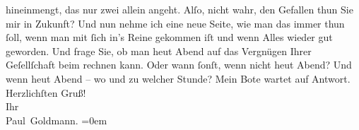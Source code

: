 \begin{ledgroupsized}[t]{13cm}
               hineinmengt, das nur zwei allein angeht. Alſo, nicht wahr, den Gefallen thun Sie mir
                  \strikeout{\textcolor{gray}{ehe}} in Zukunft? {\dotsfour}\pend
           \pstart
           {\pb}Und nun nehme ich eine neue Seite, \strikeout{\textcolor{gray}{aus}} wie man das immer thun ſoll, wenn man mit ſich in’s Reine gekommen iſt und
               wenn Alles wieder gut geworden. Und frage Sie, ob man heut{ }Abend auf das Vergnügen Ihrer Geſellſchaft beim \label{K_L02645-2v}\label{K_L02645-2h} rechnen\strikeout{\textcolor{gray}{×}} kann. Oder wann ſonſt, wenn nicht heut{ }Abend? Und wenn heut{ }Abend – wo und zu welcher Stunde?\pend
           \pstart
           Mein Bote wartet auf Antwort.\pend
           \pstart
           Herzlichſten Gruß! {\\[\baselineskip]}Ihr {\\[\baselineskip]}\spacefill\mbox{Paul Goldmann.}\pend
           \leftskip=0em{}
         
         \endnumbering{}\end{ledgroupsized}  \newcommand{\dateiname}{L02645}\newcommand{\titel}{Paul Goldmann an Arthur Schnitzler, 7. 12. 1889}\newcommand{\editorInnen}{Martin Anton Müller und Laura Untner}
      